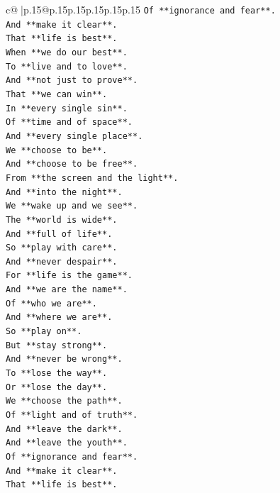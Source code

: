 \documentclass{article}
\begin{document}
{\begin{supertabular}{c@{$\;$}|p{.15\linewidth}@{}p{.15\linewidth}p{.15\linewidth}p{.15\linewidth}p{.15\linewidth}p{.15\linewidth}}
{{{\texttt{Of **ignorance and fear**.} \\
\texttt{And **make it clear**.} \\
\texttt{That **life is best**.} \\
\texttt{When **we do our best**.} \\
\texttt{To **live and to love**.} \\
\texttt{And **not just to prove**.} \\
\texttt{That **we can win**.} \\
\texttt{In **every single sin**.} \\
\texttt{Of **time and of space**.} \\
\texttt{And **every single place**.} \\
\texttt{We **choose to be**.} \\
\texttt{And **choose to be free**.} \\
\texttt{From **the screen and the light**.} \\
\texttt{And **into the night**.} \\
\texttt{We **wake up and we see**.} \\
\texttt{The **world is wide**.} \\
\texttt{And **full of life**.} \\
\texttt{So **play with care**.} \\
\texttt{And **never despair**.} \\
\texttt{For **life is the game**.} \\
\texttt{And **we are the name**.} \\
\texttt{Of **who we are**.} \\
\texttt{And **where we are**.} \\
\texttt{So **play on**.} \\
\texttt{But **stay strong**.} \\
\texttt{And **never be wrong**.} \\
\texttt{To **lose the way**.} \\
\texttt{Or **lose the day**.} \\
\texttt{We **choose the path**.} \\
\texttt{Of **light and of truth**.} \\
\texttt{And **leave the dark**.} \\
\texttt{And **leave the youth**.} \\
\texttt{Of **ignorance and fear**.} \\
\texttt{And **make it clear**.} \\
\texttt{That **life is best**.} \\
}}}
\end{supertabular}}
\end{document}
